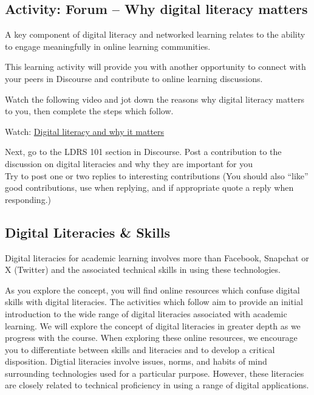 \documentclass[
]{book}
\theoremstyle{definition}
\theoremstyle{definition}
\theoremstyle{definition}
\theoremstyle{definition}
\theoremstyle{remark}
\begin{document}
\hypertarget{activity-forum-why-digital-literacy-matters}{%
\subsection*{Activity: Forum -- Why digital literacy matters}\label{activity-forum-why-digital-literacy-matters}}

\begin{reflect}
A key component of digital literacy and networked learning relates to the ability to engage meaningfully in online learning communities.

This learning activity will provide you with another opportunity to connect with your peers in Discourse and contribute to online learning discussions.

Watch the following video and jot down the reasons why digital literacy matters to you, then complete the steps which follow.

Watch: \href{https://www.youtube.com/watch?v=p2k3C-iB88w}{Digital literacy and why it matters}

Next, go to the LDRS 101 section in Discourse. Post a contribution to the discussion on digital literacies and why they are important for you\\
Try to post one or two replies to interesting contributions (You should also ``like'' good contributions, use \citet{username} when replying, and if appropriate quote a reply when responding.)
\end{reflect}

\hypertarget{digital-literacies-skills}{%
\subsection*{Digital Literacies \& Skills}\label{digital-literacies-skills}}

Digital literacies for academic learning involves more than Facebook, Snapchat or X (Twitter) and the associated technical skills in using these technologies.

As you explore the concept, you will find online resources which confuse digital skills with digital literacies. The activities which follow aim to provide an initial introduction to the wide range of digital literacies associated with academic learning. We will explore the concept of digital literacies in greater depth as we progress with the course. When exploring these online resources, we encourage you to differentiate between skills and literacies and to develop a critical disposition. Digtial literacies involve issues, norms, and habits of mind surrounding technologies used for a particular purpose. However, these literacies are closely related to technical proficiency in using a range of digital applications.
\end{document}
